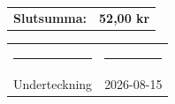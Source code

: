 \documentclass[a4paper,11pt]{article}
\begin{document}
\vspace{0.8cm}


\begin{flushright}

\begin{tabular}{lr}
    \textbf{Slutsumma:} & \textbf{52,00 kr}
\end{tabular}

\end{flushright}

\vfill


\begin{center}

\begin{tabular}{p{6cm} p{6cm}}
    \rule{6cm}{0.4pt} &
    \rule{6cm}{0.4pt} \\[0.15cm]
    Underteckning &
    2026-08-15
\end{tabular}

\end{center}
\end{document}

